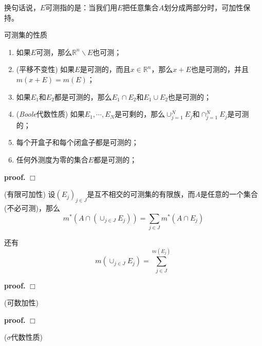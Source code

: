 换句话说，$E$可测指的是：当我们用$E$把任意集合$A$划分成两部分时，可加性保持。

\begin{mdframed}
    \begin{lemma}
        可测集的性质
        \begin{enumerate}[itemindent=2em]
            \item 如果$E$可测，那么$\mathbb{R}^n\backslash E$也可测；
            \item (平移不变性) 如果$E$是可测的，而且$x\in \mathbb{R}^n$，那么$x+E$也是可测的，并且$m(x+E)=m(E)$；
            \item 如果$E_1$和$E_2$都是可测的，那么$E_1\cap E_2$和$E_1\cup E_2$也是可测的；
            \item (\textsl{Boole}代数性质) 如果$E_1,\cdots,E_N$是可剩的，那么$\cup_{j=1}^N E_j$和$\cap_{j=1}^N E_j$是可测的；
            \item 每个开盒子和每个闭盒子都是可测的；
            \item 任何外测度为零的集合$E$都是可测的；
        \end{enumerate}
    \end{lemma}
\end{mdframed}

\textbf{proof.} $\Box$

\begin{mdframed}
    \begin{lemma}
        (有限可加性) 设$(E_j)_{j\in J}$是互不相交的可测集的有限族，而$A$是任意的一个集合(不必可测)，那么
        \begin{equation}
            m^*(A\cap (\cup_{j\in J}E_j))=\sum_{j\in J}m^*(A\cap E_j)
        \end{equation}

        还有
        \begin{equation}
            m(\cup_{j\in J}E_j)=\sum_{j\in J}^{m(E_j)}
        \end{equation}
    \end{lemma}
\end{mdframed}

\textbf{proof.} $\Box$

\begin{mdframed}
    \begin{lemma}
        (可数加性)
    \end{lemma}
\end{mdframed}

\textbf{proof.} $\Box$

\begin{mdframed}
    \begin{lemma}
        ($\sigma$代数性质)
    \end{lemma}
\end{mdframed}

